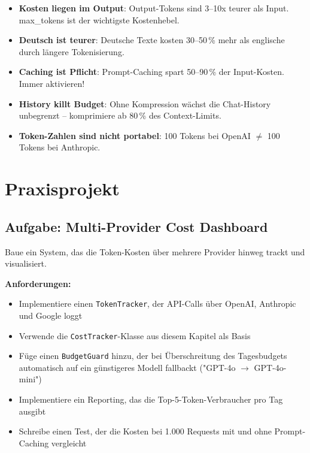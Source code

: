 \begin{merke}
\begin{itemize}
    \item \textbf{Kosten liegen im Output}: Output-Tokens sind 3--10x teurer als Input. max\_tokens ist der wichtigste Kostenhebel.
    \item \textbf{Deutsch ist teurer}: Deutsche Texte kosten 30--50\,\% mehr als englische durch längere Tokenisierung.
    \item \textbf{Caching ist Pflicht}: Prompt-Caching spart 50--90\,\% der Input-Kosten. Immer aktivieren!
    \item \textbf{History killt Budget}: Ohne Kompression wächst die Chat-History unbegrenzt -- komprimiere ab 80\,\% des Context-Limits.
    \item \textbf{Token-Zahlen sind nicht portabel}: 100 Tokens bei OpenAI $\neq$ 100 Tokens bei Anthropic.
\end{itemize}
\end{merke}

\section{Praxisprojekt}

\subsection{Aufgabe: Multi-Provider Cost Dashboard}

Baue ein System, das die Token-Kosten über mehrere Provider hinweg trackt und visualisiert.

\textbf{Anforderungen:}
\begin{itemize}[leftmargin=*]
    \item Implementiere einen \texttt{TokenTracker}, der API-Calls über OpenAI, Anthropic und Google loggt
    \item Verwende die \texttt{CostTracker}-Klasse aus diesem Kapitel als Basis
    \item Füge einen \texttt{BudgetGuard} hinzu, der bei Überschreitung des Tagesbudgets automatisch auf ein günstigeres Modell fallbackt ("GPT-4o $\rightarrow$ GPT-4o-mini")
    \item Implementiere ein Reporting, das die Top-5-Token-Verbraucher pro Tag ausgibt
    \item Schreibe einen Test, der die Kosten bei 1.000 Requests mit und ohne Prompt-Caching vergleicht
\end{itemize}


